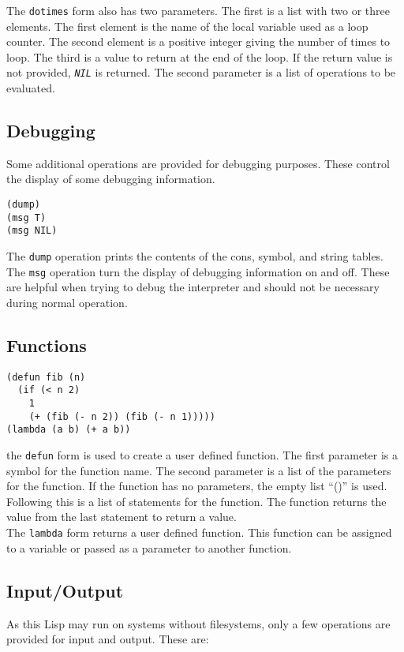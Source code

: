 \documentclass[10pt, openany]{book}
\newcommand{\function}[1]{\texttt{#1}}
\newcommand{\constant}[1]{\emph{\texttt{#1}}}
\begin{document}
The \function{dotimes} form also has two parameters.  The first is a list with two or three elements.  The first element is the name of the local variable used as a loop counter.  The second element is a positive integer giving the number of times to loop.  The third is a value to return at the end of the loop.  If the return value is not provided, \constant{NIL} is returned.  The second parameter is a list of operations to be evaluated.

\subsection{Debugging}
Some additional operations are provided for debugging purposes.  These control the display of some debugging information.

\begin{lstlisting}
(dump)
(msg T)
(msg NIL)
\end{lstlisting}

The \function{dump} operation prints the contents of the cons, symbol, and string tables.  The \function{msg} operation turn the display of debugging information on and off.  These are helpful when trying to debug the interpreter and should not be necessary during normal operation.

\subsection{Functions}
\begin{lstlisting}
(defun fib (n)
  (if (< n 2)
    1
    (+ (fib (- n 2)) (fib (- n 1)))))
(lambda (a b) (+ a b))
\end{lstlisting}

the \function{defun} form is used to create a user defined function.  The first parameter is a symbol for the function name.  The second parameter is a list of the parameters for the function.  If the function has no parameters, the empty list ``()'' is used.  Following this is a list of statements for the function.  The function returns the value from the last statement to return a value.\\

The \function{lambda} form returns a user defined function.  This function can be assigned to a variable or passed as a parameter to another function.

\subsection{Input/Output}
As this Lisp may run on systems without filesystems, only a few operations are provided for input and output.  These are:
\end{document}
